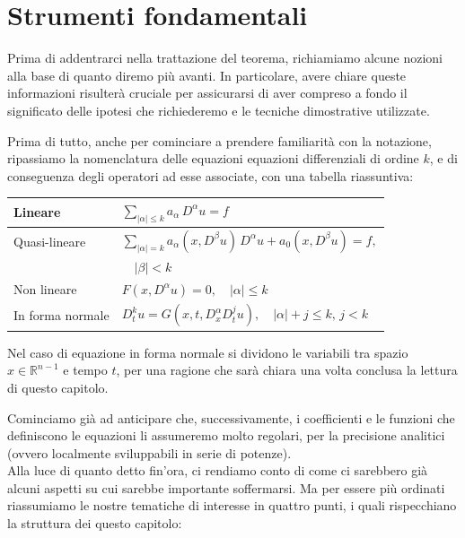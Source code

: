 \chapter{Strumenti fondamentali} \label{tools}
Prima di addentrarci nella trattazione del teorema, richiamiamo alcune nozioni alla base di quanto diremo più avanti. 
In particolare, avere chiare queste informazioni risulterà cruciale per assicurarsi di aver compreso a fondo il significato delle ipotesi che richiederemo e le tecniche dimostrative utilizzate.

Prima di tutto, anche per cominciare a prendere familiarità con la notazione, ripassiamo la nomenclatura delle equazioni equazioni differenziali di ordine $k$, e di conseguenza degli operatori ad esse associate, con una tabella riassuntiva:
\begin{center}
\renewcommand{\arraystretch}{2}
\begin{tabular}{l l} 
\hline \hline
 Lineare & $\sum_{|\alpha |\leq k} a_\alpha \, D^\alpha u = f$ \\
 \hline
 \vspace{-2mm}
 Quasi-lineare & $\sum_{|\alpha |= k} a_\alpha (x,D^\beta u) \, D^\alpha u +  a_0(x,D^\beta u)= f,$\\
 & $\quad |\beta |<k $ \\
 \hline
 Non lineare & $F(x,D^\alpha u)=0, \quad |\alpha | \leq k$ \\
 \hline
 In forma normale & $D_{t}^k u = G(x,t, D^\alpha_x D^j_t u), \quad |\alpha |+j \leq k, \, j < k$ \\
 \hline \hline
\end{tabular}
\end{center}
\begin{remark}
Nel caso di equazione in forma normale si dividono le variabili tra spazio $x\in \mathbb{R}^{n-1}$ e tempo $t$, per una ragione che sarà chiara una volta conclusa la lettura di questo capitolo.
\end{remark}
Cominciamo già ad anticipare che, successivamente, i coefficienti e le funzioni che definiscono le equazioni li assumeremo molto regolari, per la precisione analitici (ovvero localmente sviluppabili in serie di potenze).\\
Alla luce di quanto detto fin'ora, ci rendiamo conto di come ci sarebbero già alcuni aspetti su cui sarebbe importante soffermarsi.
Ma per essere più ordinati riassumiamo le nostre tematiche di interesse in quattro punti, i quali rispecchiano la struttura dei questo capitolo:
